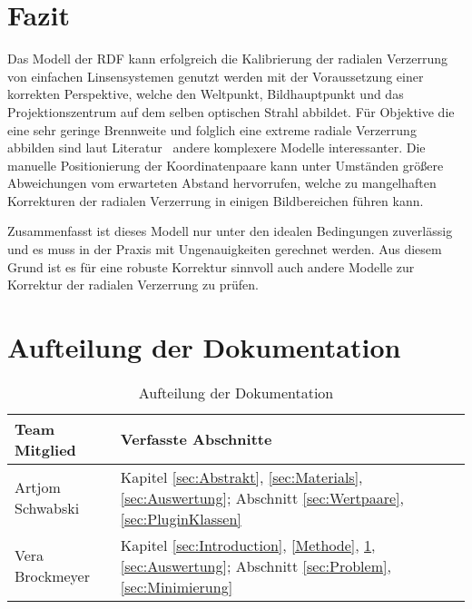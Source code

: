 \section{Fazit} \label{sec:Conclusion}
Das Modell der RDF kann erfolgreich die Kalibrierung der radialen Verzerrung von einfachen Linsensystemen genutzt werden mit der Voraussetzung einer korrekten Perspektive, welche den Weltpunkt, Bildhauptpunkt und das Projektionszentrum auf dem selben optischen Strahl abbildet. Für Objektive die eine sehr geringe Brennweite und folglich eine extreme radiale Verzerrung abbilden sind laut Literatur~\cite{WangRaddist} andere komplexere Modelle interessanter. Die manuelle Positionierung der Koordinatenpaare kann unter Umständen größere Abweichungen vom erwarteten Abstand hervorrufen, welche zu mangelhaften Korrekturen der radialen Verzerrung in einigen Bildbereichen führen kann. 

Zusammenfasst ist dieses Modell nur unter den idealen Bedingungen zuverlässig und es muss in der Praxis mit Ungenauigkeiten gerechnet werden. Aus diesem Grund ist es für eine robuste Korrektur sinnvoll auch andere Modelle zur Korrektur der radialen Verzerrung zu prüfen.
\section{Aufteilung der Dokumentation}
\begin{table}[H]
		\begin{tabular}{|p{} | p{}|} 
			\hline
			\textbf{Team Mitglied} & \textbf{Verfasste Abschnitte}\\ \hline
			Artjom Schwabski& Kapitel \ref{sec:Abstrakt}, \ref{sec:Materials}, \ref{sec:Auswertung}; Abschnitt \ref{sec:Wertpaare}, \ref{sec:PluginKlassen} \\ \hline
			Vera Brockmeyer & Kapitel \ref{sec:Introduction}, \ref{Methode}, \ref{sec:Conclusion}, \ref{sec:Auswertung}; Abschnitt \ref{sec:Problem}, \ref{sec:Minimierung} \\ \hline
		\end{tabular}
		\caption{Aufteilung der Dokumentation}
\end{table}

























